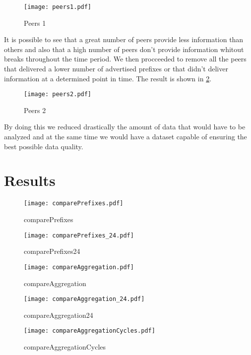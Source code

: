 \documentclass[11pt,a4paper]{scrreprt}
\begin{document}
\begin{figure}[h!]
\centering
\texttt{[image: peers1.pdf]}
\caption{Peers 1}
\label{fig:peers1}
\end{figure}

It is possible to see that a great number of peers provide less information than others and also that a high number of peers don't provide information whitout breaks throughout the time period. We then procceeded to remove all the peers that delivered a lower number of advertised prefixes or that didn't deliver information at a determined point in time. The result is shown in \ref{fig:peers2}.  

\begin{figure}[h!]
\centering
\texttt{[image: peers2.pdf]}
\caption{Peers 2}
\label{fig:peers2}
\end{figure}

By doing this we reduced drastically the amount of data that would have to be analyzed and at the same time we would have a dataset capable of ensuring the best possible data quality. 

\chapter{Results}



\begin{figure}[h!]
\centering
\texttt{[image: comparePrefixes.pdf]}
\caption{comparePrefixes}
\label{fig:comparePrefixes}
\end{figure}

\begin{figure}[h!]
\centering
\texttt{[image: comparePrefixes\_24.pdf]}
\caption{comparePrefixes24}
\label{fig:comparePrefixes_24}
\end{figure}

\begin{figure}[h!]
\centering
\texttt{[image: compareAggregation.pdf]}
\caption{compareAggregation}
\label{fig:compareAggregation}
\end{figure}

\begin{figure}[h!]
\centering
\texttt{[image: compareAggregation\_24.pdf]}
\caption{compareAggregation24}
\label{fig:compareAggregation24}
\end{figure}

\begin{figure}[h!]
\centering
\texttt{[image: compareAggregationCycles.pdf]}
\caption{compareAggregationCycles}
\label{fig:compareAggregationCycles}
\end{figure}
\end{document}
